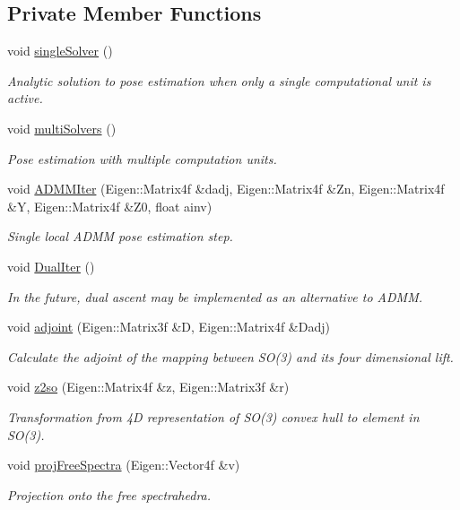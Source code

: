 \subsection*{\-Private \-Member \-Functions}
\begin{DoxyCompactItemize}
\item 
void \hyperlink{classSolvePoseAnalytic_a1bd5ff12daa4146f5ce418391cb03c7c}{single\-Solver} ()
\begin{DoxyCompactList}\small\item\em \-Analytic solution to pose estimation when only a single computational unit is active. \end{DoxyCompactList}\item 
void \hyperlink{classSolvePoseAnalytic_aea9b5c0833af7633f80b8879b26b4c99}{multi\-Solvers} ()
\begin{DoxyCompactList}\small\item\em \-Pose estimation with multiple computation units. \end{DoxyCompactList}\item 
void \hyperlink{classSolvePoseAnalytic_afdb3d837111ffdfb4fe5821dc6b6165b}{\-A\-D\-M\-M\-Iter} (\-Eigen\-::\-Matrix4f \&dadj, \-Eigen\-::\-Matrix4f \&\-Zn, \-Eigen\-::\-Matrix4f \&\-Y, \-Eigen\-::\-Matrix4f \&\-Z0, float ainv)
\begin{DoxyCompactList}\small\item\em \-Single local \-A\-D\-M\-M pose estimation step. \end{DoxyCompactList}\item 
void \hyperlink{classSolvePoseAnalytic_a477b3c908bc27e07c80ec117a6cfd8d9}{\-Dual\-Iter} ()
\begin{DoxyCompactList}\small\item\em \-In the future, dual ascent may be implemented as an alternative to \-A\-D\-M\-M. \end{DoxyCompactList}\item 
void \hyperlink{classSolvePoseAnalytic_a51160b660f01b388d8e535b00f54336e}{adjoint} (\-Eigen\-::\-Matrix3f \&\-D, \-Eigen\-::\-Matrix4f \&\-Dadj)
\begin{DoxyCompactList}\small\item\em \-Calculate the adjoint of the mapping between \-S\-O(3) and its four dimensional lift. \end{DoxyCompactList}\item 
void \hyperlink{classSolvePoseAnalytic_a5c756fab3a0a31c6f6c02d0a9a0cf62a}{z2so} (\-Eigen\-::\-Matrix4f \&z, \-Eigen\-::\-Matrix3f \&r)
\begin{DoxyCompactList}\small\item\em \-Transformation from 4\-D representation of \-S\-O(3) convex hull to element in \-S\-O(3). \end{DoxyCompactList}\item 
void \hyperlink{classSolvePoseAnalytic_addd843afaa4ce7e35826f100d46e3699}{proj\-Free\-Spectra} (\-Eigen\-::\-Vector4f \&v)
\begin{DoxyCompactList}\small\item\em \-Projection onto the free spectrahedra. \end{DoxyCompactList}\end{DoxyCompactItemize}
